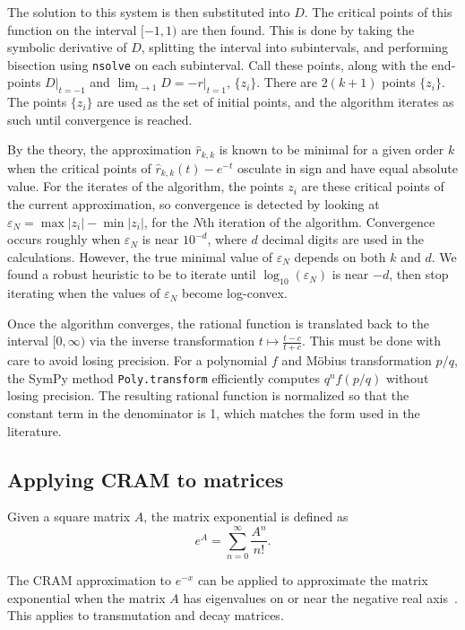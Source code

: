 The solution to this system is then substituted into $D$. The critical points
of this function on the interval $[-1, 1)$ are then found. This is done by
taking the symbolic derivative of $D$, splitting the interval into
subintervals, and performing bisection using \texttt{nsolve} on each
subinterval. Call these points, along with the end-points $D|_{t=-1}$ and
$\lim_{t\to 1} D=-r|_{t=1}$, $\{z_i\}$. There are $2(k+1)$ points $\{z_i\}$. The
points $\{z_i\}$ are used as the set of initial points, and the algorithm iterates
as such until convergence is reached.

By the theory, the approximation $\hat{r}_{k, k}$ is known to be minimal for a
given order $k$ when the critical points of $\hat{r}_{k, k}(t) - e^{-t}$
osculate in sign and have equal absolute value. For the iterates of the
algorithm, the points $z_i$ are these critical points of the current
approximation, so convergence is detected by looking at
$\varepsilon_N = \max{|z_i|} - \min{|z_i|}$, for the $N$th iteration of the
algorithm. Convergence occurs roughly when $\varepsilon_N$ is near $10^{-d}$,
where $d$ decimal digits are used in the calculations. However, the true
minimal value of $\varepsilon_N$ depends on both $k$ and $d$. We found a
robust heuristic to be to iterate until $\log_{10}{(\varepsilon_N)}$ is near $-d$,
then stop iterating when the values of $\varepsilon_N$ become log-convex.

Once the algorithm converges, the rational function is translated back to the
interval $[0, \infty)$ via the inverse transformation $t\mapsto \frac{t - c}{t
  + c}$. This must be done with care to avoid losing precision. For a
polynomial $f$ and M\"{o}bius transformation $p/q$, the SymPy
method \texttt{Poly.transform} efficiently computes
$q^nf\left(p/q\right)$ without losing precision. The resulting
rational function is normalized so that the constant term in the denominator
is 1, which matches the form used in the literature. %

\subsection{Applying CRAM to matrices}
Given a square matrix $A$, the matrix exponential is defined as
\begin{equation}
  e^{A} = \sum_{n=0}^\infty \frac{A^n}{n!}.
\end{equation}

The CRAM approximation to $e^{-x}$ can be applied to approximate the matrix
exponential when the matrix $A$ has eigenvalues on or near the negative real
axis~\cite{pusa2010computing}. This applies to transmutation and decay
matrices.

